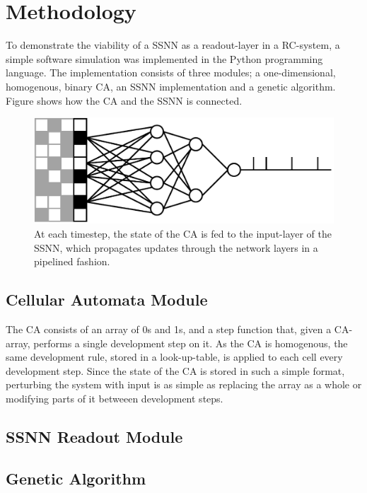 \section{Methodology}
\label{sec:methodology}


To demonstrate the viability of a SSNN as a readout-layer in a RC-system, a simple software simulation was implemented in the Python programming language.
The implementation consists of three modules; a one-dimensional, homogenous, binary CA, an SSNN implementation and a genetic algorithm.
Figure shows how the CA and the SSNN is connected.

\begin{figure}
  \centering
  \includegraphics[width=\linewidth]{figures/rc-flow}
  \caption{At each timestep, the state of the CA is fed to the input-layer of the SSNN, which propagates updates through the network layers in a pipelined fashion.}
\label{fig:rc-flow}
\end{figure}

\subsection{Cellular Automata Module}

The CA consists of an array of 0s and 1s, and a step function that, given a CA-array, performs a single development step on it.
As the CA is homogenous, the same development rule, stored in a look-up-table, is applied to each cell every development step.
Since the state of the CA is stored in such a simple format, perturbing the system with input is as simple as replacing the array as a whole or modifying parts of it betweeen development steps.

\subsection{SSNN Readout Module}

\subsection{Genetic Algorithm}
